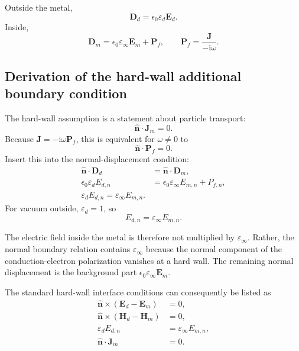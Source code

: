 \documentclass[11pt,a4paper]{article}
\newcommand{\E}{\mathbf E}
\newcommand{\Hfield}{\mathbf H}
\newcommand{\Dfield}{\mathbf D}
\newcommand{\J}{\mathbf J}
\newcommand{\Pfield}{\mathbf P}
\newcommand{\nvec}{\hat{\mathbf n}}
\newcommand{\ii}{\mathrm i}
\newcommand{\epsinf}{\varepsilon_\infty}
\newcommand{\epsd}{\varepsilon_d}
\begin{document}
Outside the metal,
\begin{equation}
    \Dfield_d=\epsilon_0\epsd\E_d.
    \label{eq:D-outside}
\end{equation}
Inside,
\begin{equation}
    \Dfield_m=\epsilon_0\epsinf\E_m+\Pfield_f,
    \qquad
    \Pfield_f=\frac{\J}{-\ii\omega}.
    \label{eq:D-inside-again}
\end{equation}

\subsection{Derivation of the hard-wall additional boundary condition}

The hard-wall assumption is a statement about particle transport:
\begin{equation}
    \boxed{\nvec\!\cdot\!\J_m=0.}
    \label{eq:bc-hard-wall-J}
\end{equation}
Because \(\J=-\ii\omega\Pfield_f\), this is equivalent for \(\omega\neq0\)
to
\begin{equation}
    \boxed{\nvec\!\cdot\!\Pfield_f=0.}
    \label{eq:bc-hard-wall-P}
\end{equation}
Insert this into the normal-displacement condition:
\begin{align}
    \nvec\!\cdot\!\Dfield_d
    &=\nvec\!\cdot\!\Dfield_m,\\
    \epsilon_0\epsd E_{d,n}
    &=\epsilon_0\epsinf E_{m,n}+P_{f,n},\\
    \boxed{\epsd E_{d,n}=\epsinf E_{m,n}.}
    \label{eq:bc-normal-E-final}
\end{align}
For vacuum outside, \(\epsd=1\), so
\begin{equation}
    E_{d,n}=\epsinf E_{m,n}.
    \label{eq:vacuum-normal-E}
\end{equation}

The electric field inside the metal is therefore not multiplied by
\(\epsinf\).  Rather, the normal boundary relation contains \(\epsinf\)
because the normal component of the conduction-electron polarization vanishes
at a hard wall.  The remaining normal displacement is the background part
\(\epsilon_0\epsinf\E_m\).

The standard hard-wall interface conditions can consequently be listed as
\begin{equation}
    \boxed{
    \begin{aligned}
        \nvec\times(\E_d-\E_m)&=0,\\
        \nvec\times(\Hfield_d-\Hfield_m)&=0,\\
        \epsd E_{d,n}&=\epsinf E_{m,n},\\
        \nvec\!\cdot\!\J_m&=0.
    \end{aligned}}
    \label{eq:all-hard-wall-bcs}
\end{equation}
\end{document}
